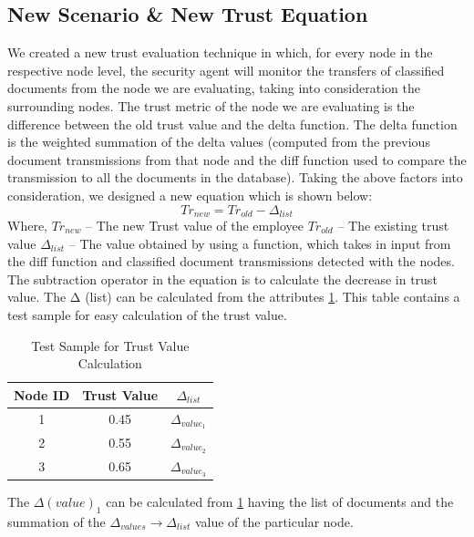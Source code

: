 \subsection{New Scenario \& New Trust Equation}
We created a new trust evaluation technique in which, for every node in the respective node level, the security agent will monitor the transfers of classified documents from the node we are evaluating, taking into consideration the surrounding nodes. The trust metric of the node we are evaluating is the difference between the old trust value and the delta function. The delta function is the weighted summation of the delta values (computed from the previous document transmissions from that node and the diff function used to compare the transmission to all the documents in the database). 
Taking the above factors into consideration, we designed a new equation which is shown below:
\begin{equation}
    Tr_{new}=Tr_{old} - \Delta_{list}
\end{equation}
Where, \(Tr_{new}\) – The new Trust value of the employee
\(Tr_{old}\) – The existing trust value
\(\Delta_{list}\) – The value obtained by using a function, which takes in input from the diff function and classified document transmissions detected with the nodes.
The subtraction operator in the equation is to calculate the decrease in trust value.
The Δ (list) can be calculated from the attributes
\ref{tab:trust_value_calculation}. This table contains a test sample for easy calculation of the trust value.

\begin{table}[h!]
    \centering
    \begin{tabular}{c | c | c}
        \hline 
        Node ID & Trust Value & \(\Delta_{list}\) \\
        \hline \hline
        1 & 0.45 & \(\Delta_{value_1}\) \\
        2 & 0.55 & \(\Delta_{value_2}\) \\
        3 & 0.65 & \(\Delta_{value_3}\) \\
    \end{tabular}
    \caption{Test Sample for Trust Value Calculation}
    \label{tab:trust_value_calculation}
\end{table}

The \(\Delta(value)_1\) can be calculated from \ref{tab:trust_value_calculation} having the list of
documents and the summation of the \(\Delta_{values} \to \Delta_{list} \) value of the particular node. 

